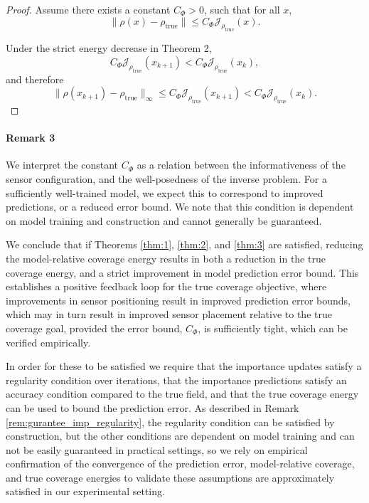 \documentclass[onefignum,onetabnum]{siamart171218} %
\begin{document}
\begin{proof}
    Assume there exists a
constant $C_\Phi > 0$, such that for all $x$,
\[
    \|\rho(x) - \rho_{\mathrm{true}}\| \leq C_\Phi \mathcal{J}_{\rho_{\mathrm{true}}}(x).
\]

Under the strict energy decrease in Theorem 2,
\[
    C_\Phi \mathcal{J}_{\rho_{\mathrm{true}}}(x_{k+1}) < C_\Phi \mathcal{J}_{\rho_{\mathrm{true}}}(x_k),
\]
and therefore
\[
    \|\rho(x_{k+1}) - \rho_{\mathrm{true}}\|_\infty \leq C_\Phi \mathcal{J}_{\rho_{\mathrm{true}}}(x_{k+1}) < C_\Phi \mathcal{J}_{\rho_{\mathrm{true}}}(x_k).
\]
\end{proof}

\paragraph{Remark 3} We interpret the constant \(C_\Phi\) as a relation between the informativeness of the sensor configuration, and the well-posedness of the inverse problem. For a sufficiently well-trained model, we expect this to correspond to improved predictions, or a reduced error bound. We note that this condition is dependent on model training and construction and cannot generally be guaranteed.

We conclude that if Theorems \ref{thm:1}, \ref{thm:2}, and \ref{thm:3} are satisfied, reducing the model-relative coverage energy results in both a reduction in the true coverage energy, and a strict improvement in model prediction error bound.
This establishes a positive feedback loop for the true coverage objective, where improvements in sensor positioning result in improved prediction error bounds, which may in turn result in improved sensor placement relative to the true coverage goal, provided the error bound, \(C_\Phi\), is sufficiently tight, which can be verified empirically.

In order for these to be satisfied we require that the importance updates satisfy a regularity condition over iterations, that the importance predictions satisfy an accuracy condition compared to the true field, and that the true coverage energy can be used to bound the prediction error. As described in Remark \ref{rem:gurantee_imp_regularity}, the regularity condition can be satisfied by construction, but the other conditions are dependent on model training and can not be easily guaranteed in practical settings, so we rely on empirical confirmation of the convergence of the prediction error, model-relative coverage, and true coverage energies to validate these assumptions are approximately satisfied in our experimental setting. 
\end{document}
